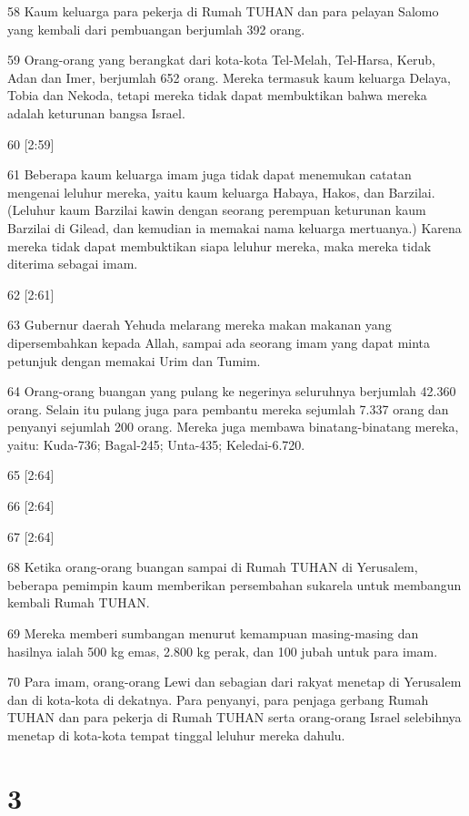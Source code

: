 \par 58 Kaum keluarga para pekerja di Rumah TUHAN dan para pelayan Salomo yang kembali dari pembuangan berjumlah 392 orang.
\par 59 Orang-orang yang berangkat dari kota-kota Tel-Melah, Tel-Harsa, Kerub, Adan dan Imer, berjumlah 652 orang. Mereka termasuk kaum keluarga Delaya, Tobia dan Nekoda, tetapi mereka tidak dapat membuktikan bahwa mereka adalah keturunan bangsa Israel.
\par 60 [2:59]
\par 61 Beberapa kaum keluarga imam juga tidak dapat menemukan catatan mengenai leluhur mereka, yaitu kaum keluarga Habaya, Hakos, dan Barzilai. (Leluhur kaum Barzilai kawin dengan seorang perempuan keturunan kaum Barzilai di Gilead, dan kemudian ia memakai nama keluarga mertuanya.) Karena mereka tidak dapat membuktikan siapa leluhur mereka, maka mereka tidak diterima sebagai imam.
\par 62 [2:61]
\par 63 Gubernur daerah Yehuda melarang mereka makan makanan yang dipersembahkan kepada Allah, sampai ada seorang imam yang dapat minta petunjuk dengan memakai Urim dan Tumim.
\par 64 Orang-orang buangan yang pulang ke negerinya seluruhnya berjumlah 42.360 orang. Selain itu pulang juga para pembantu mereka sejumlah 7.337 orang dan penyanyi sejumlah 200 orang. Mereka juga membawa binatang-binatang mereka, yaitu: Kuda-736; Bagal-245; Unta-435; Keledai-6.720.
\par 65 [2:64]
\par 66 [2:64]
\par 67 [2:64]
\par 68 Ketika orang-orang buangan sampai di Rumah TUHAN di Yerusalem, beberapa pemimpin kaum memberikan persembahan sukarela untuk membangun kembali Rumah TUHAN.
\par 69 Mereka memberi sumbangan menurut kemampuan masing-masing dan hasilnya ialah 500 kg emas, 2.800 kg perak, dan 100 jubah untuk para imam.
\par 70 Para imam, orang-orang Lewi dan sebagian dari rakyat menetap di Yerusalem dan di kota-kota di dekatnya. Para penyanyi, para penjaga gerbang Rumah TUHAN dan para pekerja di Rumah TUHAN serta orang-orang Israel selebihnya menetap di kota-kota tempat tinggal leluhur mereka dahulu.

\chapter{3}

